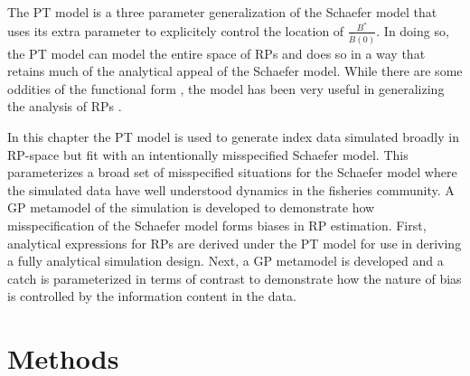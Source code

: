 %
The PT model is a three parameter generalization of the Schaefer model that uses 
its extra parameter to explicitely control the location of $\frac{B^*}{\bar B(0)}$. 
In doing so, the PT model can model the entire space of RPs and does so in a way that 
retains much of the analytical appeal of the Schaefer model. While there are some oddities
of the functional form \cite{punt_extending_2019, fletcher_restructuring_1978}, the model 
has been very useful in generalizing the analysis of RPs \cite{winker_jabba_2018}.  

%
In this chapter the PT model is used to generate index data simulated broadly 
in RP-space but fit with an intentionally misspecified Schaefer model. This 
parameterizes a broad set of misspecified situations for the Schaefer model 
where the simulated data have well understood dynamics in the fisheries 
community. A GP metamodel of the simulation is developed to demonstrate how 
misspecification of the Schaefer model forms biases in RP estimation. First, 
analytical expressions for RPs are derived under the PT model for use in 
deriving a fully analytical simulation design. Next, a GP metamodel is 
developed and a catch is parameterized in terms of contrast to demonstrate 
how the nature of bias is controlled by the information content in the data.

%

\section{Methods \label{meth}}

